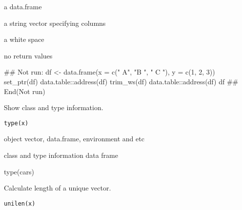 \documentclass[letterpaper]{book}
\begin{document}
%
\begin{Arguments}
\begin{ldescription}
\item[\code{df}] a data.frame

\item[\code{cols}] a string vector specifying columns

\item[\code{ws}] a white space 
\end{ldescription}
\end{Arguments}
%
\begin{Value}
no return values
\end{Value}
%
\begin{Examples}
\begin{ExampleCode}
## Not run: df <- data.frame(x = c(" A", "B ", " C "), y = c(1, 2, 3))
set_ptr(df)
data.table::address(df)
trim_ws(df)
data.table::address(df)
df
## End(Not run)

\end{ExampleCode}
\end{Examples}
%
\begin{Description}
Show class and type information.
\end{Description}
%
\begin{Usage}
\begin{verbatim}
type(x)
\end{verbatim}
\end{Usage}
%
\begin{Arguments}
\begin{ldescription}
\item[\code{x}] object vector, data.frame, environment and etc
\end{ldescription}
\end{Arguments}
%
\begin{Value}
class and type information data frame
\end{Value}
%
\begin{Examples}
\begin{ExampleCode}
type(cars)

\end{ExampleCode}
\end{Examples}
%
\begin{Description}
Calculate length of a unique vector.
\end{Description}
%
\begin{Usage}
\begin{verbatim}
unilen(x)
\end{verbatim}
\end{Usage}
\end{document}
